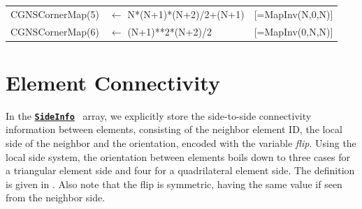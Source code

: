 \documentclass[a4paper,headsepline]{scrreprt}
\newcommand\rf[1]{\prettyref{#1}}
\newcommand\ttbf[1]{\textbf{\texttt{#1}}}
\newcommand\SideInfo{\hyperlink{SideInfo}{\ttbf{SideInfo}}}
\begin{document}
\begin{algorithm}[h!]
{{{\begin{tabular}{lll}
        CGNSCornerMap(5) & $\leftarrow$ N*(N+1)*(N+2)/2+(N+1)&   [=MapInv(N,0,N)] \; \\
        CGNSCornerMap(6) & $\leftarrow$ (N+1)**2*(N+2)/2     &   [=MapInv(0,N,N)] \; \\
      \end{tabular}
      }                                                                       
    }
  }
\end{algorithm}


\FloatBarrier

\section{Element Connectivity}
\label{sec:flip}


In the \SideInfo~ array, we explicitly store the side-to-side connectivity information between elements, consisting of the neighbor element ID, the local side of the neighbor  and the orientation, encoded with the variable \emph{flip}. 
Using the local side system, the orientation between elements boils down to three cases for a triangular element side and four for a quadrilateral element side. The definition is given in  \rf{fig:flip}. Also note that the flip is symmetric, having the same value if seen from the neighbor side.
\end{document}
